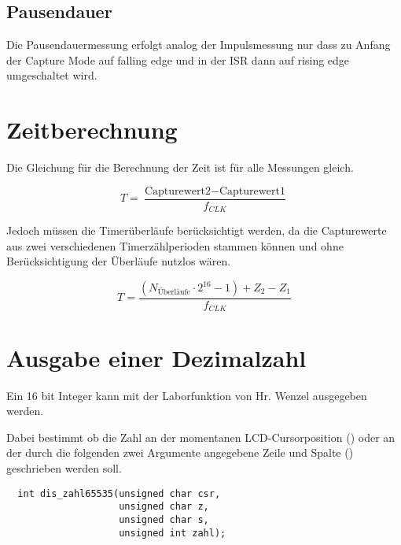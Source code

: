 \documentclass[a4paper, 12pt]{article}
\begin{document}
  \subsection{Pausendauer}
  Die Pausendauermessung erfolgt analog der Impulsmessung nur dass zu Anfang der
  Capture Mode auf falling edge und in der ISR dann auf rising edge umgeschaltet wird.

  \section{Zeitberechnung}
  Die Gleichung für die Berechnung der Zeit ist für alle Messungen gleich.

  \begin{equation}
  T = \frac{\textrm{Capturewert2} - \textrm{Capturewert1}}{f_{CLK}}
\end{equation}

  Jedoch müssen die Timerüberläufe berücksichtigt werden, da die Capturewerte
  aus zwei verschiedenen Timerzählperioden stammen können und ohne
  Berücksichtigung der Überläufe nutzlos wären.

  \begin{equation}
    T = \frac{(N_{\textrm{Überläufe}} \cdot 2^{16}-1) + Z_2 - Z_1}{f_{CLK}}
  \end{equation}

  \section{Ausgabe einer Dezimalzahl}
  Ein 16 bit Integer kann mit der Laborfunktion  von
  Hr. Wenzel ausgegeben werden.

  Dabei bestimmt  ob die Zahl an
  der momentanen LCD-Cursorposition () oder an der durch die folgenden zwei
  Argumente angegebene Zeile und Spalte () geschrieben werden soll. 
  \begin{lstlisting}
  int dis_zahl65535(unsigned char csr, 
                    unsigned char z, 
                    unsigned char s, 
                    unsigned int zahl); 
  \end{lstlisting}
\end{document}
